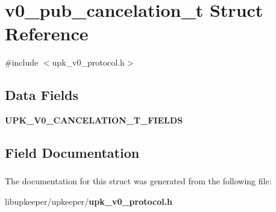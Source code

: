 \section{v0\_\-pub\_\-cancelation\_\-t Struct Reference}
\label{structv0__pub__cancelation__t}


{\ttfamily \#include $<$upk\_\-v0\_\-protocol.h$>$}

\subsection*{Data Fields}
\begin{DoxyCompactItemize}
\item 
{\bf UPK\_\-V0\_\-CANCELATION\_\-T\_\-FIELDS}
\end{DoxyCompactItemize}


\subsection{Field Documentation}
\subsubsection[{UPK\_\-V0\_\-CANCELATION\_\-T\_\-FIELDS}]{}\label{structv0__pub__cancelation__t_aa666fc3762a64a16b9b92035631310bc}


The documentation for this struct was generated from the following file:\begin{DoxyCompactItemize}
\item 
libupkeeper/upkeeper/{\bf upk\_\-v0\_\-protocol.h}\end{DoxyCompactItemize}
